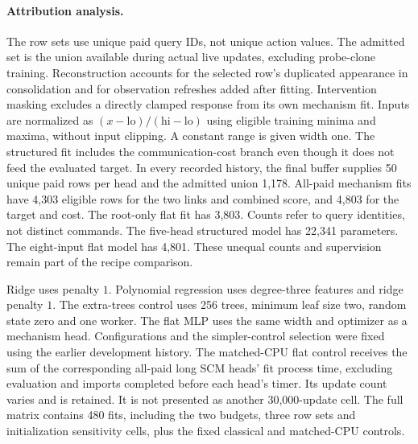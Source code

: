 \paragraph{Attribution analysis.}
The row sets use unique paid query IDs, not unique action values. The admitted
set is the union available during actual live updates, excluding probe-clone
training. Reconstruction accounts for the selected row's duplicated appearance
in consolidation and for observation refreshes added after fitting. Intervention
masking excludes a directly clamped response from its own mechanism fit.
Inputs are normalized as $(x-\mathrm{lo})/(\mathrm{hi}-\mathrm{lo})$ using
eligible training minima and maxima, without input clipping. A constant range
is given width one. The structured fit includes the
communication-cost branch even though it does not feed the evaluated target.
In every recorded history, the final buffer supplies 50 unique paid rows per
head and the admitted union 1,178. All-paid mechanism fits have 4,303 eligible
rows for the two links and combined score, and 4,803 for the target and cost.
The root-only flat fit has 3,803. Counts refer to query identities, not distinct
commands. The five-head structured model has 22,341 parameters. The eight-input
flat model has 4,801. These unequal counts and supervision remain part of the
recipe comparison.

Ridge uses penalty $1$. Polynomial regression uses degree-three features and
ridge penalty $1$. The extra-trees control uses 256 trees, minimum leaf size two,
random state zero and one worker. The flat MLP uses the same width and optimizer
as a mechanism head. Configurations and the simpler-control selection were
fixed using the earlier development history. The matched-CPU flat control
receives the sum of the corresponding all-paid long SCM heads' fit process
time, excluding evaluation and imports completed before each head's timer. Its update count varies and is retained.
It is not presented as another 30,000-update cell. The full matrix contains
480 fits, including the two budgets, three row sets and initialization
sensitivity cells, plus the fixed classical and matched-CPU controls.

